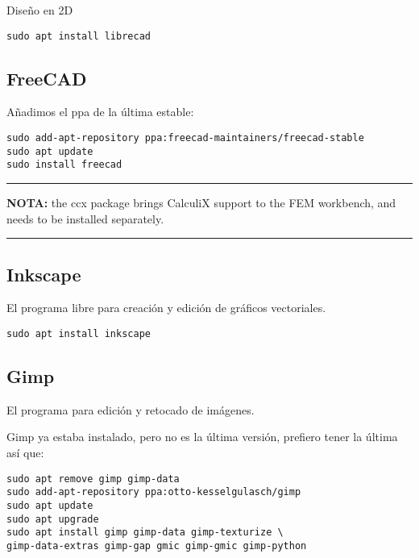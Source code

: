 \documentclass[
  12pt,
  spanish,
]{article}
\begin{document}
Diseño en 2D

\begin{verbatim}
sudo apt install librecad
\end{verbatim}

\hypertarget{freecad}{%
\subsection{FreeCAD}\label{freecad}}

Añadimos el ppa de la última estable:

\begin{verbatim}
sudo add-apt-repository ppa:freecad-maintainers/freecad-stable
sudo apt update
sudo install freecad
\end{verbatim}

\begin{center}\rule{0.5\linewidth}{\linethickness}\end{center}

\textbf{NOTA:} the ccx package brings CalculiX support to the FEM
workbench, and needs to be installed separately.

\begin{center}\rule{0.5\linewidth}{\linethickness}\end{center}

\hypertarget{inkscape}{%
\subsection{Inkscape}\label{inkscape}}

El programa libre para creación y edición de gráficos vectoriales.

\begin{verbatim}
sudo apt install inkscape
\end{verbatim}

\hypertarget{gimp}{%
\subsection{Gimp}\label{gimp}}

El programa para edición y retocado de imágenes.

Gimp ya estaba instalado, pero no es la última versión, prefiero tener
la última así que:

\begin{verbatim}
sudo apt remove gimp gimp-data
sudo add-apt-repository ppa:otto-kesselgulasch/gimp
sudo apt update
sudo apt upgrade
sudo apt install gimp gimp-data gimp-texturize \
gimp-data-extras gimp-gap gmic gimp-gmic gimp-python
\end{verbatim}
\end{document}
